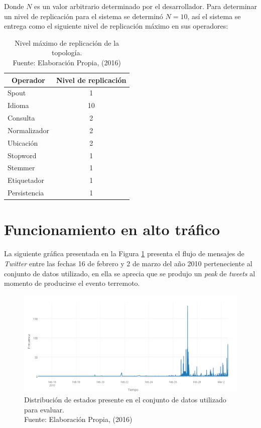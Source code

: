 Donde $N$ es un valor arbitrario determinado por el desarrollador. Para determinar un nivel de replicación para el sistema se determinó $N = 10$, así el sistema se entrega como el siguiente nivel de replicación máximo en sus operadores:

\begin{table}[H]
\centering
\caption[Nivel máximo de replicación de la topología.]{Nivel máximo de replicación de la topología.\\Fuente: Elaboración Propia, (2016)}
\label{tab:topologiaFinal}
\begin{tabular}{|l|c|}
\hline
\multicolumn{1}{|c|}{\textbf{Operador}} & \textbf{Nivel de replicación} \\ \hline
Spout & 1 \\ \hline
Idioma & 10 \\ \hline
Consulta & 2 \\ \hline
Normalizador & 2 \\ \hline
Ubicación & 2 \\ \hline
Stopword & 1 \\ \hline
Stemmer & 1 \\ \hline
Etiquetador & 1 \\ \hline
Persistencia & 1 \\ \hline
\end{tabular}
\end{table} 

\section{Funcionamiento en alto tráfico}
\label{sec:AltoTrafico}

La siguiente gráfica presentada en la Figura \ref{fig:graficoDeTweets} presenta el flujo de mensajes de \textit{Twitter} entre las fechas 16 de febrero y 2 de marzo del año 2010 perteneciente al conjunto de datos utilizado, en ella se aprecia que se produjo un \textit{peak} de \textit{tweets} al momento de producirse el evento terremoto.

\begin{figure}[H]
        \centering
        \captionsetup{justification=centering}
        \includegraphics[scale=0.6]{images/GraficoTweetsHastaEventoZoom1.png}
        \caption[Distribución de estados presente en el conjunto de datos utilizado para evaluar.]{Distribución de estados presente en el conjunto de datos utilizado para evaluar.\\Fuente: Elaboración Propia, (2016)}
        \label{fig:graficoDeTweets}
\end{figure}


